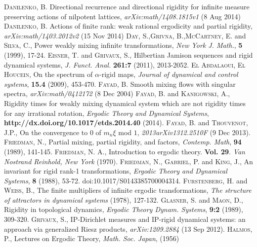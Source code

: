 \documentclass[12pt]{amsart}
\begin{document}
\begin{thebibliography}{9}
 \textsc{Danilenko, B.} Directional recurrence and directional rigidity for infinite measure preserving actions of nilpotent lattices, \textit{arXiv:math/1408.1815v1} (8 Aug 2014) 
 \textsc{Danilenko, B.} Actions of finite rank: weak rational ergodicity and partial rigidity, \textit{arXiv:math/1403.2012v2} (15 Nov 2014) 
 \textsc{Day, S.},\textsc{Grivna, B.},\textsc{McCartney, E.} and \textsc{Silva, C.}, Power weakly mixing infinite transformations, \textit{New York J. Math.}, \textbf{5} (1999), 17-24. 
 \textsc{Eisner, T.} and \textsc{Grivaux, S.}, Hilbertian Jamison sequences and rigid dynamical systems, \textit{J. Funct. Anal.} \textbf{261:7} (2011), 2013-2052.
 \textsc{El Abdalaoui, El Houcein}, On the spectrum of $\alpha$-rigid maps, \textit{Journal of dynamical and control systems}, \textbf{15.4} (2009), 453-470.
 \textsc{Fayad, B.} Smooth mixing flows with singular spectra, \textit{arXiv:math/0412172} (8 Dec 2004) 
 \textsc{Fayad, B.} and \textsc{Kanigowski, A.}, Rigidity times for weakly mixing dynamical system which are not rigidity times for any irrational rotation, \textit{Ergodic Theory and Dynamical Systems}, \textbf{http://dx.doi.org/10.1017/etds.2014.40} (2014). 
 \textsc{Fayad, B.} and \textsc{Thouvenot, J.P.}, On the convergence to $0$ of $m_n \xi $ mod $1$, \textit{2013arXiv1312.2510F} (9 Dec 2013). 
 \textsc{Friedman, N.}, Partial mixing, partial rigidity, and factors, \textit{Contemp. Math}, \textbf{94} (1989), 141-145.
 \textsc{Friedman, N. A.}, Introduction to ergodic theory. \textbf{Vol. 29}. \textit{Van Nostrand Reinhold, New York} (1970).
  \textsc{Friedman, N.}, \textsc{Gabriel, P.} and \textsc{King, J.}, An invariant for rigid rank-1 transformations, \textit{Ergodic Theory and Dynamical Systems}, \textbf{8} (1988), 53-72. doi:10.1017/S0143385700004314. 
 \textsc{Furstenberg, H.} and \textsc{Weiss, B.}, The finite multipliers of infinite ergodic transformations, \textit{The structure of attractors in dynamical systems} (1978), 127-132.
 \textsc{Glasner, S.} and \textsc{Maon, D.}, Rigidity in topological dynamics, \textit{Ergodic Theory Dynam. Systems}, \textbf{9:2} (1989), 309-320.
 \textsc{Grivaux, S.}, IP-Dirichlet measures and IP-rigid dynamical systems: an approach via generalized Riesz products, \textit{arXiv:1209.2884} (13 Sep 2012).
 \textsc{Halmos, P.}, Lectures on Ergodic Theory, \textit{Math. Soc. Japan}, (1956) 

\end{thebibliography}
\end{document}
